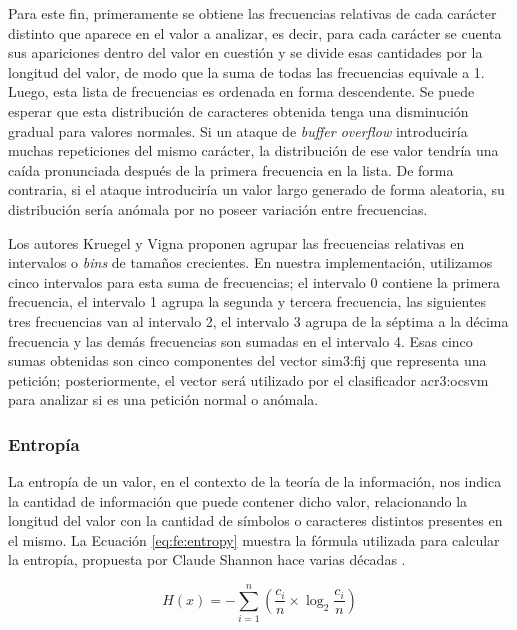 Para este fin, primeramente se obtiene las frecuencias relativas de cada
carácter distinto que aparece en el valor a analizar, es decir, para cada
carácter se cuenta sus apariciones dentro del valor en cuestión y se
divide esas cantidades por la longitud del valor, de modo que la suma
de todas las frecuencias equivale a 1. Luego, esta lista de frecuencias
es ordenada en forma descendente.
Se puede esperar que esta distribución de caracteres obtenida tenga una
disminución gradual para valores normales. Si un ataque de \textit{buffer overflow}
introduciría muchas repeticiones del mismo carácter, la distribución de ese
valor tendría una caída pronunciada después de la primera frecuencia en la
lista. De forma contraria, si el ataque introduciría un valor largo generado
de forma aleatoria, su distribución sería anómala por no poseer variación
entre frecuencias.

Los autores Kruegel y Vigna \cite{kruegel2003anomaly} proponen agrupar las
frecuencias relativas en intervalos o \textit{bins} de tamaños crecientes.
En nuestra implementación, utilizamos cinco intervalos para esta suma de
frecuencias; el intervalo 0 contiene la primera frecuencia, el intervalo 1
agrupa la segunda y tercera frecuencia, las siguientes tres frecuencias
van al intervalo 2, el intervalo 3 agrupa de la séptima a la décima
frecuencia y las demás frecuencias son sumadas en el intervalo 4.
Esas cinco sumas obtenidas son cinco componentes del vector \gls{sim3:fij}
que representa una petición; posteriormente, el vector será utilizado
por el clasificador \gls{acr3:ocsvm} para analizar si es una petición
normal o anómala.


\subsubsection{Entropía}

La entropía de un valor, en el contexto de la teoría de la información,
nos indica la cantidad de información que puede contener dicho valor,
relacionando la longitud del valor con la cantidad de símbolos o caracteres
distintos presentes en el mismo.
La Ecuación \ref{eq:fe:entropy} muestra la fórmula utilizada para calcular
la entropía, propuesta por Claude Shannon hace varias décadas
\cite{encyMathEntropy}.

\begin{equation}
    \label{eq:fe:entropy}
    H(x) =
    - \sum_{i=1}^{n}
    \left(
        \frac{c_{i}}{n} \times \log_{2} \frac{c_{i}}{n}
    \right)
\end{equation}

